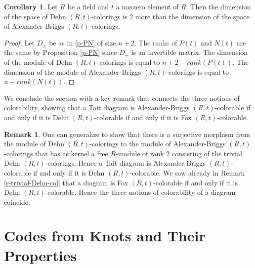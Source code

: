 \documentclass[11pt,a4paper]{article}
\theoremstyle{definition}
\newtheorem{corollary}[theorem]{Corollary}
\newtheorem{remark}[theorem]{Remark}
\begin{document}
\begin{corollary}
\label{cor:DAB}
Let $R$ be a field and $t$ a nonzero element of $R$. Then the dimension of the space of Dehn $(R,t)$-colorings is $2$ more than the dimension of the space of Alexander-Briggs $(R,t)$-colorings.
\end{corollary}

\begin{proof}
Let $D_{\pm}$ be as in \ref{p-PN} of size $n+2$. The ranks of $P(t)$ and $N(t)$ are the same by Proposition \ref{p-PN} since $D_{\pm}$ is an invertible matrix. The dimension of the module of Dehn $(R,t)$-colorings is equal to $n+2- rank(P(t))$.
The dimension of the module of Alexander-Briggs $(R,t)$-colorings is equal to $n- rank(N(t))$. 
\end{proof}

We conclude the section with a key remark that connects the three notions of colorability, showing that a Tait diagram is Alexander-Briggs $(R,t)$-colorable if and only if it is Dehn $(R,t)$-colorable if and only if it is Fox $(R,t)$-colorable. 

\begin{remark}\label{r-morphDtoAB}
One can generalize \cite[Theorem 3.1]{carter2014three} to show that 
there is a surjective morphism from the module of Dehn $(R,t)$-colorings to the module of Alexander-Briggs $(R,t)$-colorings 
that has as kernel a free $R$-module of rank $2$ consisting of the trivial Dehn $(R,t)$-colorings.
Hence a Tait diagram is Alexander-Briggs $(R,t)$-colorable if and only if it is  Dehn  $(R,t)$-colorable.
We saw already in Remark \ref{r-trivial-Dehn-col} that  a diagram is Fox $(R,t)$-colorable if and only if it is  Dehn  $(R,t)$-colorable.
Hence the three notions of colorability of a diagram coincide.
\end{remark}


\section{Codes from Knots and Their Properties}
\label{sec:codes}
\label{sec:3}
\end{document}
